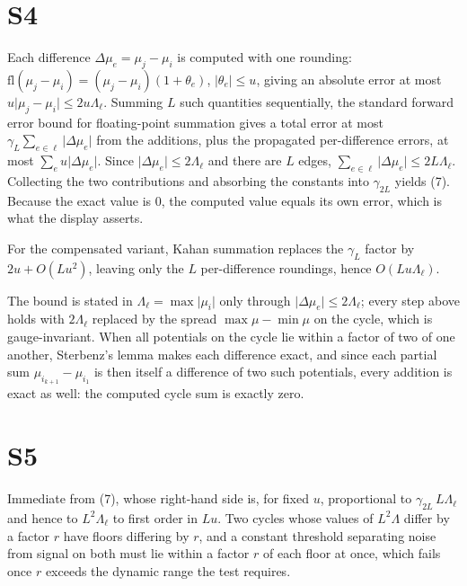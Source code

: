 \documentclass[11pt,a4paper]{article}
\theoremstyle{definition}
\theoremstyle{remark}
\newcommand{\abs}[1]{\lvert#1\rvert}
\newcommand{\mach}{u}
\begin{document}
\section*{S4}
Each difference $\Delta\mu_e = \mu_j-\mu_i$ is computed with one
rounding: $\mathrm{fl}(\mu_j-\mu_i) = (\mu_j-\mu_i)(1+\theta_e)$,
$\abs{\theta_e}\le\mach$, giving an absolute error at most
$\mach\abs{\mu_j-\mu_i}\le 2\mach\Lambda_\ell$. Summing $L$ such
quantities sequentially, the standard forward error bound for
floating-point summation \citep[Ch.~4]{higham2002} gives a total error
at most $\gamma_{L}\sum_{e\in\ell}\abs{\Delta\mu_e}$ from the additions,
plus the propagated per-difference errors, at most
$\sum_{e}\mach\abs{\Delta\mu_e}$. Since
$\abs{\Delta\mu_e}\le 2\Lambda_\ell$ and there are $L$ edges,
$\sum_{e\in\ell}\abs{\Delta\mu_e}\le 2L\Lambda_\ell$. Collecting the two
contributions and absorbing the constants into $\gamma_{2L}$ yields
(7). Because the exact value is $0$, the computed
value equals its own error, which is what the display asserts.

For the compensated variant, Kahan summation \citep{kahan1965,
higham2002} replaces the $\gamma_L$ factor by $2\mach + O(L\mach^{2})$,
leaving only the $L$ per-difference roundings, hence
$O(L\mach\Lambda_\ell)$.

The bound is stated in $\Lambda_\ell=\max\abs{\mu_i}$ only through
$\abs{\Delta\mu_e}\le 2\Lambda_\ell$; every step above holds with
$2\Lambda_\ell$ replaced by the spread $\max\mu-\min\mu$ on the cycle,
which is gauge-invariant. When all potentials on the cycle lie within a
factor of two of one another, Sterbenz's lemma \citep{goldberg1991} makes
each difference exact, and since each partial sum
$\mu_{i_{k+1}}-\mu_{i_1}$ is then itself a difference of two such
potentials, every addition is exact as well: the computed cycle sum is
exactly zero.

\section*{S5}
Immediate from (7), whose right-hand side is, for
fixed $\mach$, proportional to $\gamma_{2L}\,L\Lambda_\ell$ and hence to
$L^{2}\Lambda_\ell$ to first order in $L\mach$. Two cycles whose values of
$L^{2}\Lambda$ differ by a factor $r$ have floors differing by $r$, and
a constant threshold separating noise from signal on both must lie
within a factor $r$ of each floor at once, which fails once $r$ exceeds
the dynamic range the test requires.
\end{document}
